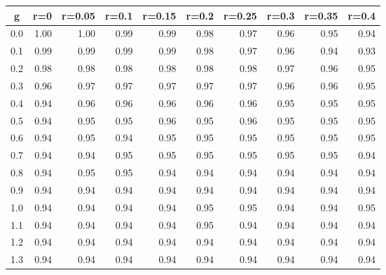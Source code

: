 %
\begin{table}[!tbp]
 \begin{center}
 \begin{tabular}{rrrrrrrrrr}\hline\hline
\multicolumn{1}{c}{g}&\multicolumn{1}{c}{r=0}&\multicolumn{1}{c}{r=0.05}&\multicolumn{1}{c}{r=0.1}&\multicolumn{1}{c}{r=0.15}&\multicolumn{1}{c}{r=0.2}&\multicolumn{1}{c}{r=0.25}&\multicolumn{1}{c}{r=0.3}&\multicolumn{1}{c}{r=0.35}&\multicolumn{1}{c}{r=0.4}\tabularnewline
\hline
0.0&1.00&1.00&0.99&0.99&0.98&0.97&0.96&0.95&0.94\tabularnewline
0.1&0.99&0.99&0.99&0.99&0.98&0.97&0.96&0.94&0.93\tabularnewline
0.2&0.98&0.98&0.98&0.98&0.98&0.98&0.97&0.96&0.95\tabularnewline
0.3&0.96&0.97&0.97&0.97&0.97&0.97&0.96&0.96&0.95\tabularnewline
0.4&0.94&0.96&0.96&0.96&0.96&0.96&0.95&0.95&0.95\tabularnewline
0.5&0.94&0.95&0.95&0.96&0.95&0.96&0.95&0.95&0.95\tabularnewline
0.6&0.94&0.95&0.94&0.95&0.95&0.95&0.95&0.95&0.95\tabularnewline
0.7&0.94&0.94&0.95&0.95&0.95&0.95&0.95&0.95&0.94\tabularnewline
0.8&0.94&0.95&0.95&0.94&0.94&0.94&0.94&0.94&0.94\tabularnewline
0.9&0.94&0.94&0.94&0.94&0.94&0.94&0.94&0.94&0.94\tabularnewline
1.0&0.94&0.94&0.94&0.94&0.95&0.95&0.94&0.94&0.95\tabularnewline
1.1&0.94&0.94&0.94&0.94&0.95&0.94&0.94&0.94&0.94\tabularnewline
1.2&0.94&0.94&0.94&0.94&0.94&0.94&0.94&0.94&0.94\tabularnewline
1.3&0.94&0.94&0.94&0.94&0.94&0.94&0.94&0.94&0.94\tabularnewline
\hline
\end{tabular}

\end{center}

\end{table}

